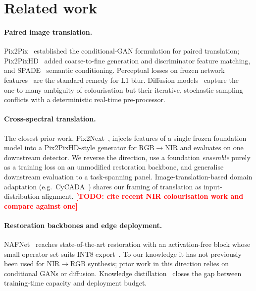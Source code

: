 \documentclass[10pt,twocolumn,letterpaper]{article}
\newcommand{\TODO}[1]{\textcolor{red}{\textbf{[TODO: #1]}}}
\begin{document}
\section{Related work}
\label{sec:related}

\paragraph{Paired image translation.} Pix2Pix~\cite{isola2017image} established the conditional-GAN formulation for paired translation; Pix2PixHD~\cite{wang2018pix2pixhd} added coarse-to-fine generation and discriminator feature matching, and SPADE~\cite{park2019spade} semantic conditioning. Perceptual losses on frozen network features~\cite{johnson2016perceptual} are the standard remedy for L1 blur. Diffusion models~\cite{ho2020denoising,saharia2022image} capture the one-to-many ambiguity of colourisation but their iterative, stochastic sampling conflicts with a deterministic real-time pre-processor.

\paragraph{Cross-spectral translation.} The closest prior work, Pix2Next~\cite{pix2next2024}, injects features of a single frozen foundation model into a Pix2PixHD-style generator for RGB$\rightarrow$NIR and evaluates on one downstream detector. We reverse the direction, use a foundation \emph{ensemble} purely as a training loss on an unmodified restoration backbone, and generalise downstream evaluation to a task-spanning panel. Image-translation-based domain adaptation (e.g.\ CyCADA~\cite{hoffman2018cycada}) shares our framing of translation as input-distribution alignment. \TODO{cite recent NIR colourisation work and compare against one}

\paragraph{Restoration backbones and edge deployment.} NAFNet~\cite{chen2022nafnet} reaches state-of-the-art restoration with an activation-free block whose small operator set suits INT8 export~\cite{jacob2018quantization,gholami2021survey}. To our knowledge it has not previously been used for NIR$\rightarrow$RGB synthesis; prior work in this direction relies on conditional GANs or diffusion. Knowledge distillation~\cite{hinton2015distilling,romero2015fitnets} closes the gap between training-time capacity and deployment budget.
\end{document}
